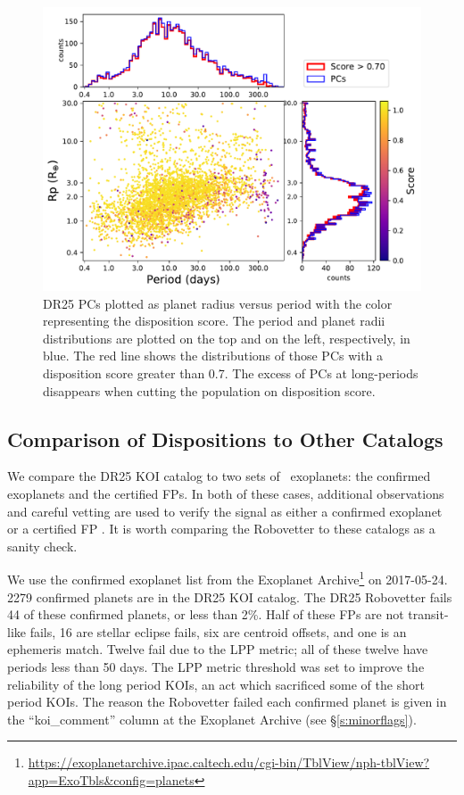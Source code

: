 \begin{figure}[htb]
    \centering
    \includegraphics[width=\linewidth]{f7.pdf}
    \caption{DR25 PCs plotted as planet radius versus period with the color representing the disposition score. The period and planet radii distributions are plotted on the top and on the left, respectively, in blue. The red line shows the distributions of those PCs with a disposition score greater than 0.7. The excess of PCs at long-periods disappears when cutting the population on disposition score. }
    \label{f:catalogPlot}
\end{figure}

\subsection{Comparison of Dispositions to Other Catalogs}
We compare the DR25 KOI catalog to two sets of \Kepler\ exoplanets: the confirmed exoplanets and the certified FPs.  In both of these cases, additional observations and careful vetting are used to verify the signal as either a confirmed exoplanet or a certified FP \citep{Bryson2017c}. It is worth comparing the Robovetter to these catalogs as a sanity check.  

We use the confirmed exoplanet list from the Exoplanet Archive\footnote{\url{https://exoplanetarchive.ipac.caltech.edu/cgi-bin/TblView/nph-tblView?app=ExoTbls\&config=planets}} on 2017-05-24.  2279 confirmed planets are in the DR25 KOI catalog.  The DR25 Robovetter fails 44 of these confirmed planets, or less than 2\%. Half of these FPs are not transit-like fails, 16 are stellar eclipse fails, six are centroid offsets, and one is an ephemeris match. Twelve fail due to the LPP metric; all of these twelve have periods less than 50 days.  The LPP metric threshold was set to improve the reliability of the long period KOIs, an act which sacrificed some of the short period KOIs.  The reason the Robovetter failed each confirmed planet is given in the ``koi\_comment'' column at the Exoplanet Archive (see \S\ref{s:minorflags}). 

